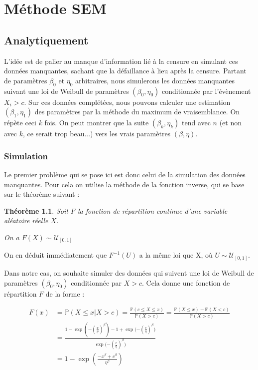 \documentclass[a4paper]{report}
\newtheorem{theorem}{Théorème}
\begin{document}
  \chapter {Méthode SEM}
  
  \section{Analytiquement}
  
  L'idée est de palier au manque d'information lié à la censure en simulant ces données manquantes, sachant que la défaillance à lieu après la censure. Partant de paramètres $\beta_0$ et $\eta_0$ arbitraires, nous simulerons les données manquantes suivant une loi de Weibull de paramètres $(\beta_0,\eta_0)$ conditionnée par l'évènement ${X_i >c}$. Sur ces données complétées, nous pouvons calculer une estimation $(\beta_1,\eta_1)$ des paramètres par la méthode du maximum de vraisemblance. On répète ceci $k$ fois. On peut montrer que la suite $(\beta_k, \eta_k)$ tend avec $n$ (et non avec $k$, ce serait trop beau...) vers les vrais paramètres $(\beta,\eta)$.
  
  \subsection{Simulation}
  
  Le premier problème qui se pose ici est donc celui de la simulation des données manquantes. Pour cela on utilise la méthode de la fonction inverse, qui se base sur le théorème suivant : 
  
 \begin{theorem}
Soit $F$ la fonction de répartition continue d'une variable aléatoire réelle $X$. 

On a $F(X) \sim \mathcal{U}_{[0,1]}$
\end{theorem}
  
 On en déduit immédiatement que $F^{-1}(U)$ a la même loi que X, où $U\sim\mathcal{U}_{[0,1]}$. 
 
Dans notre cas, on souhaite simuler des données qui suivent une loi de Weibull de paramètres $(\beta_0,\eta_0)$ conditionnée par ${X>c}$. Cela donne une fonction de répartition $F$ de la forme :
 
 \begin{align*}
 F(x) & =  \mathbb{P}(X \leq x | X > c) = \frac{\mathbb{P}(c \leq X \leq x)}{\mathbb{P}(X>c)} 
= \frac{\mathbb{P} (X \leq x) - \mathbb{P}(X<c)}{\mathbb{P}(X>c)} \\
&= \frac{1-\exp{(-(\frac{x}{\eta})^{\beta})} - 1 + \exp{(-(\frac{c}{\eta})^{\beta}})}{\exp{(-(\frac{c}{\eta})^{\beta}})} \\
&= 1 - \exp{\left( \frac{-x^{\beta}+c^{\beta}}{\eta^{\beta}} \right)}
\end{align*}
\end{document}
